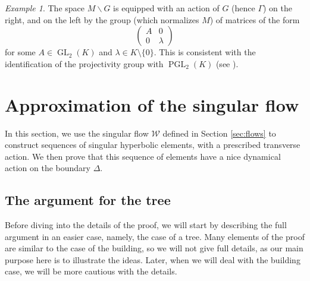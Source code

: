 \documentclass[a4paper, 11pt]{article}
\theoremstyle{plain}
\theoremstyle{definition}
\theoremstyle{remark}
\newtheorem{example}[proposition]{Example}
\DeclareMathOperator{\GL}{GL}
\DeclareMathOperator{\PGL}{PGL}
\newcommand{\scrW}{\mathscr W}
\begin{document}
\begin{example}

 
 The space $M\backslash G$ is
equipped with an action of $G$ (hence $\Gamma$) on the right, and on the left by the group (which normalizes $M$) of matrices of the form
$$\begin{pmatrix}
    A & 0\\0 & \lambda
\end{pmatrix}$$
for some $A\in\GL_2(K)$ and $\lambda\in K\setminus\{0\}$. This is consistent with the identification of the projectivity group with $\PGL_2(K)$ (see \cite{Knarr}).

\end{example}


\section{Approximation of the singular flow}

In this section, we use the singular flow $\scrW$ defined in Section \ref{sec:flows} to construct sequences of singular hyperbolic elements, with a prescribed transverse action. We then prove that this sequence of elements have a nice dynamical action on the boundary $\Delta$.


\subsection{The argument for the tree}

Before diving into the details of the proof, we will start by describing the full argument in an easier case, namely, the case of a tree. Many elements of the proof are similar to the case of the building, so we will not give full details,
as our main purpose here is to illustrate the ideas. Later, when we will deal with the building case, we will be more cautious with the details.
\end{document}
